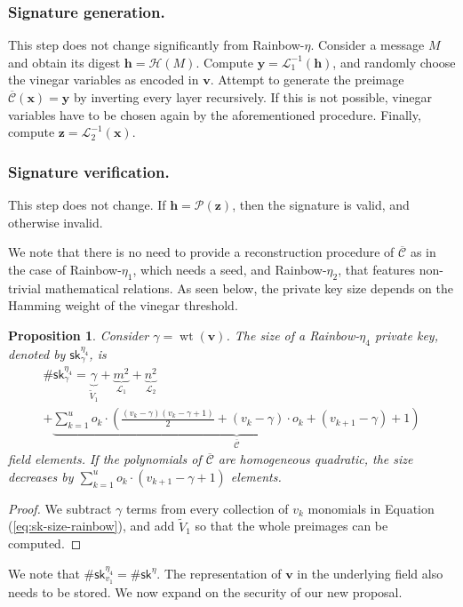 \documentclass[english]{ufsc-thesis-rn46-2019/ufsc-thesis-rn46-2019}
\DeclareMathOperator*{\wt}{wt}
\newtheorem{proposition}[theorem]{Proposition}
\theoremstyle{definition}
\begin{document}
\subsubsection{Signature generation.}

This step does not change significantly from Rainbow-$\eta$. Consider a message
$M$ and obtain its digest $\mathbf{h} = \mathcal{H}(M)$. Compute
$\mathbf{y} = \mathcal{L}_{1}^{-1}(\mathbf{h})$, and randomly choose the
vinegar variables as encoded in $\mathbf{v}$. Attempt to generate the preimage
$\overline{\mathcal{C}}(\mathbf{x}) = \mathbf{y}$ by inverting every layer
recursively. If this is not possible, vinegar variables have to be chosen again
by the aforementioned procedure. Finally, compute
$\mathbf{z} = \mathcal{L}_{2}^{-1}(\mathbf{x})$.

\subsubsection{Signature verification.}

This step does not change. If $\mathbf{h} = \mathcal{P}(\mathbf{z})$, then the
signature is valid, and otherwise invalid.

We note that there is no need to provide a reconstruction procedure of
$\overline{\mathcal{C}}$ as in the case of Rainbow-$\eta_{1}$, which needs
a seed, and Rainbow-$\eta_{2}$, that features non-trivial mathematical
relations. As seen below, the private key size depends on the Hamming weight of
the vinegar threshold.
\begin{proposition}
  Consider $\gamma = \wt(\mathbf{v})$. The size of a Rainbow-$\eta_{4}$ private
  key, denoted by $\textsf{sk}^{\eta_{4}}_{\gamma}$, is
  \begin{multline}
    \#\textsf{sk}^{\eta_{4}}_{\gamma}
      = \underbrace{\gamma}_{\widetilde{V}_{1}}
        + \underbrace{m^{2}}_{\mathcal{L}_{1}}
        + \underbrace{n^{2}}_{\mathcal{L}_{2}} \\
        + \underbrace{\sum_{k = 1}^{u} o_{k} \cdot \left(
            \frac{(v_{k} - \gamma)(v_{k} - \gamma + 1)}{2}
              + (v_{k} - \gamma) \cdot o_{k} + (v_{k + 1} - \gamma) + 1
          \right)}_{\overline{\mathcal{C}}}
  \end{multline}
  field elements. If the polynomials of $\overline{\mathcal{C}}$ are
  homogeneous quadratic, the size decreases by
  $\sum_{k = 1}^{u} o_{k} \cdot (v_{k + 1} - \gamma + 1)$ elements.
\end{proposition}
\begin{proof}
  We subtract $\gamma$ terms from every collection of $v_{k}$ monomials in
  Equation (\ref{eq:sk-size-rainbow}), and add $\widetilde{V}_{1}$ so that
  the whole preimages can be computed.
\end{proof}
We note that $\#\textsf{sk}^{\eta_{4}}_{v_{1}} = \#\textsf{sk}^{\eta}$. The
representation of $\mathbf{v}$ in the underlying field also needs to be
stored. We now expand on the security of our new proposal.
\end{document}
